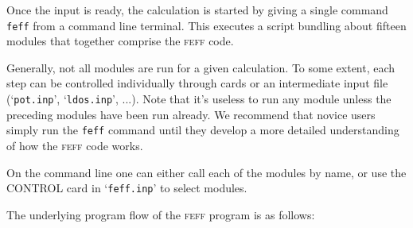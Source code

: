\documentclass[11pt,oneside]{report} %
\renewcommand{\htmlref}[2]{\hyperlink{#2}{#1}}
\newcommand{\program}[1]{\textsc{#1}}
\newcommand{\feff}{\program{feff}}
\newcommand{\file}[1]{`\texttt{#1}'}
\newcommand{\module}[1]{\textrm{\bf{#1}}}
\renewcommand{\htmlref}[2]{{#1}} %
\begin{document}
Once the input is ready, the calculation is started 
by giving a single command
\texttt{feff} from a command line terminal.  This executes a script bundling about fifteen modules that together comprise the {\feff} code.  

Generally, not all modules are run for a given calculation.  To some extent, each step can be
controlled individually through cards or an intermediate input file (\file{pot.inp}, \file{ldos.inp}, ...).  Note that it's useless to run any module unless the preceding modules have been run already.  We recommend that novice users simply run the \texttt{feff} command until they develop a more detailed understanding of how the {\feff} code works.  

On the command line one can either call each of the modules by name, or use the \htmlref{CONTROL}{card:con} card in \file{feff.inp} to select modules.  



The underlying program flow of the {\feff} program is as follows:
\end{document}
